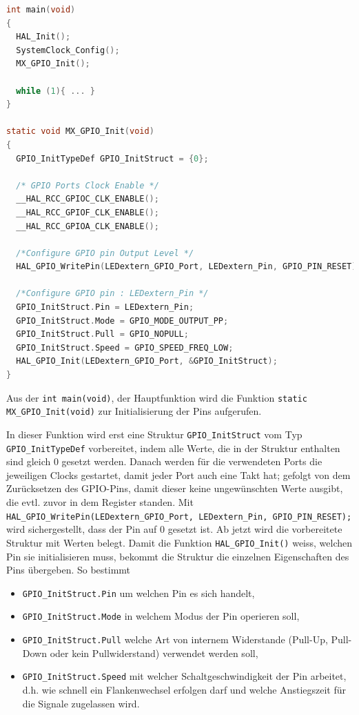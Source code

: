 \begin{lstlisting}[language=C, caption={Funktion zur Initialisierung der GPIO-Pins aus einem STM32-Projekt.}, label={lst:stm32_mx_gpio_init}]
int main(void)
{
  HAL_Init();
  SystemClock_Config();
  MX_GPIO_Init();
  
  while (1){ ... } 
}

static void MX_GPIO_Init(void)
{
  GPIO_InitTypeDef GPIO_InitStruct = {0};

  /* GPIO Ports Clock Enable */
  __HAL_RCC_GPIOC_CLK_ENABLE();
  __HAL_RCC_GPIOF_CLK_ENABLE();
  __HAL_RCC_GPIOA_CLK_ENABLE();

  /*Configure GPIO pin Output Level */
  HAL_GPIO_WritePin(LEDextern_GPIO_Port, LEDextern_Pin, GPIO_PIN_RESET);

  /*Configure GPIO pin : LEDextern_Pin */
  GPIO_InitStruct.Pin = LEDextern_Pin;
  GPIO_InitStruct.Mode = GPIO_MODE_OUTPUT_PP;
  GPIO_InitStruct.Pull = GPIO_NOPULL;
  GPIO_InitStruct.Speed = GPIO_SPEED_FREQ_LOW;
  HAL_GPIO_Init(LEDextern_GPIO_Port, &GPIO_InitStruct);
}
\end{lstlisting}

Aus der \texttt{int main(void)}, der Hauptfunktion wird die Funktion \texttt{static MX\_GPIO\_Init(void)} zur Initialisierung der Pins aufgerufen.

In dieser Funktion wird erst eine Struktur \texttt{GPIO\_InitStruct} vom Typ \texttt{GPIO\_InitTypeDef} vorbereitet, indem alle Werte, die in der Struktur enthalten sind gleich $0$ gesetzt werden.
Danach werden für die verwendeten Ports die jeweiligen Clocks gestartet, damit jeder Port auch eine Takt hat;
gefolgt von dem Zurücksetzen des GPIO-Pins, damit dieser keine ungewünschten Werte ausgibt, die evtl. zuvor in dem Register standen.
Mit \texttt{ HAL\_GPIO\_WritePin(LEDextern\_GPIO\_Port, LEDextern\_Pin, GPIO\_PIN\_RESET);} wird sichergestellt, dass der Pin auf $0$ gesetzt ist.
Ab jetzt wird die vorbereitete Struktur mit Werten belegt.
Damit die Funktion \texttt{HAL\_GPIO\_Init()} weiss, welchen Pin sie initialisieren muss, bekommt die Struktur die einzelnen Eigenschaften des Pins übergeben.
So bestimmt 
\begin{itemize}
	\item \texttt{GPIO\_InitStruct.Pin} um welchen Pin es sich handelt, 
	\item \texttt{GPIO\_InitStruct.Mode} in welchem Modus der Pin operieren soll,
	\item \texttt{GPIO\_InitStruct.Pull} welche Art von internem Widerstande (Pull-Up, Pull-Down oder kein Pullwiderstand) verwendet werden soll,
	\item \texttt{GPIO\_InitStruct.Speed} mit welcher Schaltgeschwindigkeit der Pin arbeitet, d.h. wie schnell ein Flankenwechsel erfolgen darf und welche Anstiegszeit für die Signale zugelassen wird.
\end{itemize}

